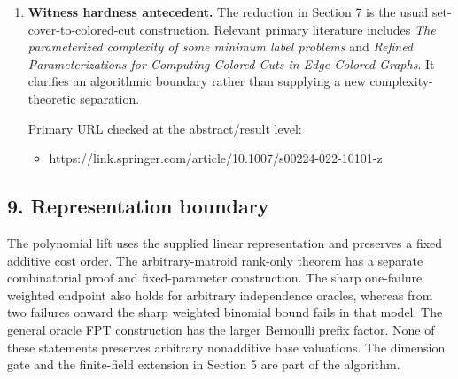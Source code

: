 \begin{enumerate}
  Primary URLs:

  \begin{itemize}
  \tightlist
  \item
    https://sites.cs.ucsb.edu/\textasciitilde daniello/papers/efficientRepSetJ.pdf
  \item
    https://arxiv.org/html/1806.11527v4
  \end{itemize}
\item
  \textbf{Witness hardness antecedent.} The reduction in Section 7 is the usual set-cover-to-colored-cut construction. Relevant primary literature includes \emph{The parameterized complexity of some minimum label problems} and \emph{Refined Parameterizations for Computing Colored Cuts in Edge-Colored Graphs}. It clarifies an algorithmic boundary rather than supplying a new complexity-theoretic separation.

  Primary URL checked at the abstract/result level:

  \begin{itemize}
  \tightlist
  \item
    https://link.springer.com/article/10.1007/s00224-022-10101-z
  \end{itemize}
\end{enumerate}

\hypertarget{af-7a1626f5ae-representation-boundary}{%
\subsection{9. Representation boundary}\label{af-7a1626f5ae-representation-boundary}}

The polynomial lift uses the supplied linear representation and preserves a fixed additive cost order. The arbitrary-matroid rank-only theorem has a separate combinatorial proof and fixed-parameter construction. The sharp one-failure weighted endpoint also holds for arbitrary independence oracles, whereas from two failures onward the sharp weighted binomial bound fails in that model. The general oracle FPT construction has the larger Bernoulli prefix factor. None of these statements preserves arbitrary nonadditive base valuations. The dimension gate and the finite-field extension in Section 5 are part of the algorithm.
